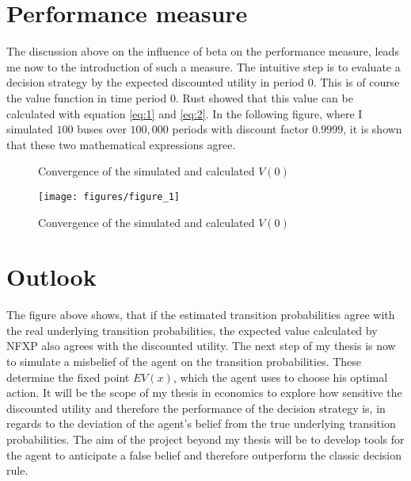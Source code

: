 \documentclass[a4paper,12pt,bold]{scrartcl}
\begin{document}
\section{Performance measure}
The discussion above on the influence of beta on the performance measure, leads me now to the introduction of such a measure. The intuitive step is to evaluate a decision strategy by the expected discounted utility in period $0$. This is of course the value function in time period 0. Rust showed that this value can be calculated with equation \ref{eq:1} and \ref{eq:2}. In the following figure, where I simulated $100$ buses over $100,000$ periods with discount factor $0.9999$, it is shown that these two mathematical expressions agree.
\begin{figure}[h]
\centering
\caption{Convergence of the simulated and calculated $V(0)$}

\texttt{[image: figures/figure\_1]}
\caption{Convergence of the simulated and calculated $V(0)$}
 
\end{figure}

\section{Outlook}
The figure above shows, that if the estimated transition probabilities agree with the real underlying transition probabilities, the expected value calculated by NFXP also agrees with the discounted utility. The next step of my thesis is now to simulate a misbelief of the agent on the transition probabilities. These determine the fixed point $EV(x)$, which the agent uses to choose his optimal action. It will be the scope of my thesis in economics to explore how sensitive the discounted utility and therefore the performance of the decision strategy is, in regards to the deviation of the agent's belief from the true underlying transition probabilities. The aim of the project beyond my thesis will be to develop tools for the agent to anticipate a false belief and therefore outperform the classic decision rule.

\newpage


\end{document}

